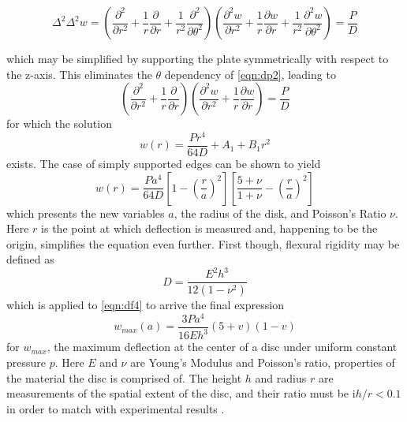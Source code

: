 \documentclass[12pt,times,twocolumn,3p]{elsarticle}
\begin{document}
\begin{strip}
\noindent\makebox[\linewidth][l]{\rule{0.4\textwidth}{0.4pt}}
\begin{equation} \label{eqn:dp2}
\Delta^2\Delta^2 w =
\left(\frac{\partial^2}{\partial r^2} +
\frac{1}{r}\frac{\partial}{\partial r} +
\frac{1}{r^2}\frac{\partial^2}{\partial \theta^2}\right)
\left(\frac{\partial^2 w}{\partial r^2} +
\frac{1}{r}\frac{\partial w}{\partial r} +
\frac{1}{r^2}\frac{\partial^2 w}{\partial \theta^2}\right) =
\frac{P}{D}
\end{equation}
\begin{flushleft}
\noindent\makebox[\linewidth][r]{\rule{0.4\textwidth}{0.4pt}}
\end{flushleft}
\end{strip}

\noindent which may be simplified by supporting the plate symmetrically with
respect to the z-axis. This eliminates the $\theta$ dependency of \cref{eqn:dp2},
leading to
\begin{equation} \label{eqn:dp3}
\left(\frac{\partial^2}{\partial r^2} +
\frac{1}{r}\frac{\partial}{\partial r}
\right)
\left(\frac{\partial^2 w}{\partial r^2} +
\frac{1}{r}\frac{\partial w}{\partial r}
\right) = \frac{P}{D}
\end{equation}
for which the solution
\begin{equation}
w(r) = \frac{P r^4}{64 D} +A_1 +B_1 r^2
\end{equation}
exists. The case of simply supported edges can be shown \cite{boresi} to yield
\begin{equation} \label{eqn:df4}
w(r) = \frac{P a^4}{64 D}
\left[1-\left(\frac{r}{a}\right)^2\right]
\left[\frac{5+\nu}{1+\nu}-\left(\frac{r}{a}\right)^2\right]
\end{equation}
which presents the new variables $a$, the radius of the disk, and Poisson's Ratio
$\nu$. Here $r$ is the point at which deflection is measured and, happening to be
the origin, simplifies the equation even further. First though, flexural rigidity
may be defined as
\begin{equation}
D = \frac{E^2 h^3}{12(1 - \nu^2)}
\end{equation}
which is applied to \cref{eqn:df4} to arrive the final expression
\begin{equation} \label{eqn:def}
w_{max}(a) = \frac{3 P a^4}{16 E h^3}(5+v)(1-v)
\end{equation}
for $w_{max}$, the maximum deflection at the center of a disc under uniform
constant pressure $p$. Here $E$ and $\nu$ are Young's Modulus and Poisson's ratio,
properties of the material the disc is comprised of. The height $h$ and radius $r$
are measurements of the spatial extent of the disc, and their ratio must be
i$h/r < 0.1$ in order to match with experimental results \cite{boresi}.
\end{document}
